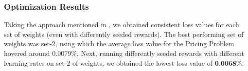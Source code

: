 \subsubsection{Optimization Results} \label{sec:PriProbRes - Optimization}
Taking the approach mentioned in , we obtained consistent loss values for each set of weights (even with differently seeded rewards). The best performing set of weights was set-2, using which the average loss value for the Pricing Problem hovered around $0.0079\%$. Next, running differently seeded rewards with different learning rates on set-2 of weights, we obtained the lowest loss value of $\textbf{0.0068\%}$.

